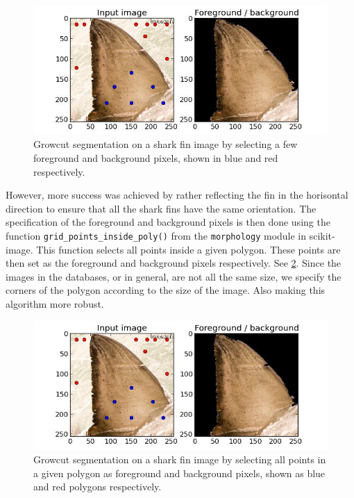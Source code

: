 \documentclass[a4paper,10pt]{article}
\begin{document}
\begin{figure}[H]
 \centering
 \includegraphics[width=5in]{segmentation.jpg}
 \caption{Growcut segmentation on a shark fin image by selecting a few
foreground and background pixels, shown in blue and red respectively.}
 \label{segmentation}
\end{figure}

However, more success was achieved by rather reflecting the fin in the
horisontal direction to ensure that all the shark fins have the
same orientation.  The specification of
the foreground and background pixels is then done using the function
\texttt{grid\_points\_inside\_poly()} from the \texttt{morphology} module in
scikit-image.
This function selects all points inside a given polygon.  These points are then
set as the foreground and background pixels respectively.  See
\ref{segmentation1}.
Since the images in the databases, or in general, are not all the same size, we
specify the corners of the polygon according to the size of the image. 
Also making this algorithm more robust.  \\

\begin{figure}[H]
 \centering
 \includegraphics[width=5in]{segmentation.jpg}
 \caption{Growcut segmentation on a shark fin image by selecting all points in a
given polygon as foreground and background pixels, shown as blue and red
 polygons respectively.}
 \label{segmentation1}
\end{figure}
\end{document}
